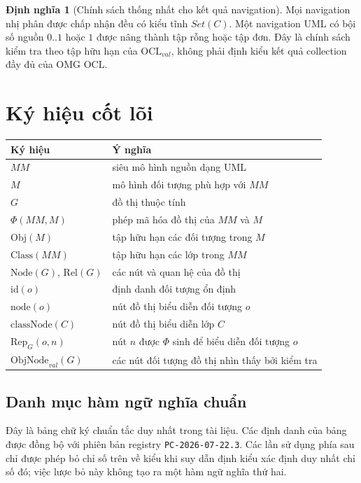 \documentclass[11pt,a4paper]{article}
\theoremstyle{definition}
\newtheorem{definition}{Định nghĩa}
\newcommand{\OCLval}{\mathrm{OCL}_{val}}
\newcommand{\Obj}{\mathrm{Obj}}
\newcommand{\Class}{\mathrm{Class}}
\newcommand{\Node}{\mathrm{Node}}
\newcommand{\Rel}{\mathrm{Rel}}
\newcommand{\id}{\mathrm{id}}
\newcommand{\node}{\mathrm{node}}
\newcommand{\classNode}{\mathrm{classNode}}
\newcommand{\RepG}{\mathrm{Rep}_{G}}
\newcommand{\PhiEnc}{\Phi}
\newcommand{\ObjNodeVal}{\mathrm{ObjNode}_{val}}
\begin{document}
\begin{definition}[Chính sách thống nhất cho kết quả navigation]
Mọi navigation nhị phân được chấp nhận đều có kiểu tĩnh $Set(C)$. Một
navigation UML có bội số nguồn $0..1$ hoặc $1$ được nâng thành tập rỗng hoặc tập
đơn. Đây là chính sách kiểm tra theo tập hữu hạn của $\OCLval$, không phải định
kiểu kết quả collection đầy đủ của OMG OCL.
\end{definition}

\section{Ký hiệu cốt lõi}

\begin{longtable}{ll}
\toprule
Ký hiệu & Ý nghĩa\\
\midrule
$MM$ & siêu mô hình nguồn dạng UML\\
$M$ & mô hình đối tượng phù hợp với $MM$\\
$G$ & đồ thị thuộc tính\\
$\PhiEnc(MM,M)$ & phép mã hóa đồ thị của $MM$ và $M$\\
$\Obj(M)$ & tập hữu hạn các đối tượng trong $M$\\
$\Class(MM)$ & tập hữu hạn các lớp trong $MM$\\
$\Node(G)$, $\Rel(G)$ & các nút và quan hệ của đồ thị\\
$\id(o)$ & định danh đối tượng ổn định\\
$\node(o)$ & nút đồ thị biểu diễn đối tượng $o$\\
$\classNode(C)$ & nút đồ thị biểu diễn lớp $C$\\
$\RepG(o,n)$ & nút $n$ được $\PhiEnc$ sinh để biểu diễn đối tượng $o$\\
$\ObjNodeVal(G)$ & các nút đối tượng đồ thị nhìn thấy bởi kiểm tra\\
\bottomrule
\end{longtable}

\subsection*{Danh mục hàm ngữ nghĩa chuẩn}

Đây là bảng chữ ký chuẩn tắc duy nhất trong tài liệu. Các định danh của bảng
được đồng bộ với phiên bản registry \texttt{PC-2026-07-22.3}. Các lần sử dụng
phía sau chỉ được phép bỏ chỉ số trên về kiểu khi suy dẫn định kiểu xác định duy
nhất chỉ số đó; việc lược bỏ này không tạo ra một hàm ngữ nghĩa thứ hai.
\end{document}
